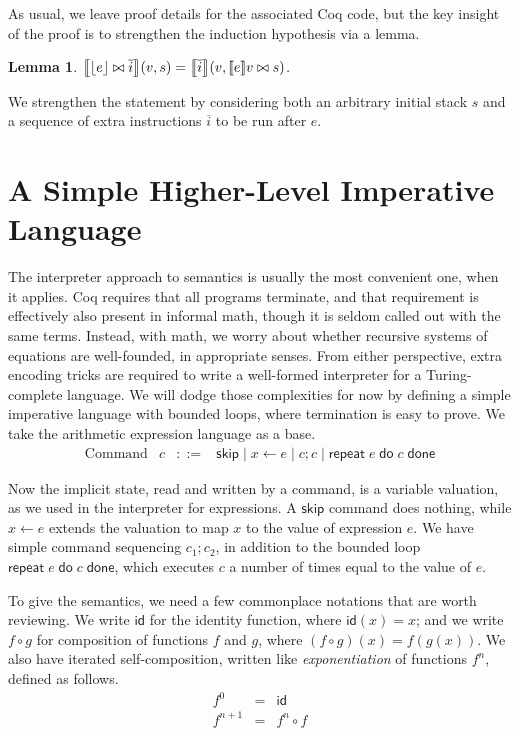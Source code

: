 \documentclass{amsbook}
\newtheorem{lemma}[theorem]{Lemma}
\theoremstyle{definition}
\theoremstyle{remark}
\numberwithin{section}{chapter}
\numberwithin{equation}{chapter}
\begin{document}
As usual, we leave proof details for the associated Coq code, but the key insight of the proof is to strengthen the induction hypothesis via a lemma.

\begin{lemma}
  ${\left \llbracket {\left \lfloor e \right \rfloor} \bowtie \overline{i} \right \rrbracket}(v, s) = {\left \llbracket \overline{i} \right \rrbracket}(v, {\left \llbracket e \right \rrbracket}v \bowtie s)$.
\end{lemma}

We strengthen the statement by considering both an arbitrary initial stack $s$ and a sequence of extra instructions $\overline{i}$ to be run after $e$.

\section{A Simple Higher-Level Imperative Language}

\newcommand{\repet}[2]{\mathsf{repeat} \; #1 \; \mathsf{do} \; #2 \; \mathsf{done}}

The interpreter approach to semantics is usually the most convenient one, when it applies.
Coq requires that all programs terminate, and that requirement is effectively also present in informal math, though it is seldom called out with the same terms.
Instead, with math, we worry about whether recursive systems of equations are well-founded, in appropriate senses.
From either perspective, extra encoding tricks are required to write a well-formed interpreter for a Turing-complete language.
We will dodge those complexities for now by defining a simple imperative language with bounded loops, where termination is easy to prove.
We take the arithmetic expression language as a base.
\encoding
$$\begin{array}{rrcl}
  \textrm{Command} & c &::=& \mathsf{skip} \mid x \leftarrow e \mid c; c \mid \repet{e}{c}
\end{array}$$

Now the implicit state, read and written by a command, is a variable valuation, as we used in the interpreter for expressions.
A $\mathsf{skip}$ command does nothing, while $x \leftarrow e$ extends the valuation to map $x$ to the value of expression $e$.
We have simple command sequencing $c_1; c_2$, in addition to the bounded loop $\repet{e}{c}$, which executes $c$ a number of times equal to the value of $e$.

\newcommand{\id}[0]{\mathsf{id}}

To give the semantics, we need a few commonplace notations that are worth reviewing.
We write $\id$ for the identity function, where $\id(x) = x$; and we write $f \circ g$ for composition of functions $f$ and $g$, where $(f \circ g)(x) = f(g(x))$.
We also have iterated self-composition, written like \emph{exponentiation} of functions $f^n$, defined as follows.
\begin{eqnarray*}
  f^0 &=& \id \\
  f^{n+1} &=& f^n \circ f
\end{eqnarray*}
\end{document}
